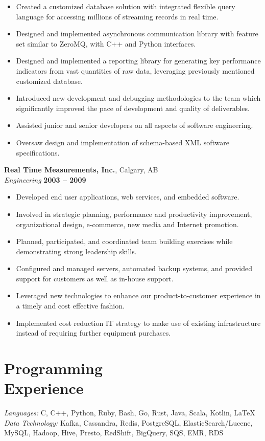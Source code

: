\documentclass[margin,line]{resume}
\begin{document}
\begin{resume}
    \begin{itemize}
    \item Created a customized database solution with integrated flexible query language for accessing millions of streaming records in real time.
    \item Designed and implemented asynchronous communication library with feature set similar to ZeroMQ, with C++ and Python interfaces.
    \item Designed and implemented a reporting library for generating key performance indicators from vast quantities of raw data, leveraging previously mentioned customized database.
    \item Introduced new development and debugging methodologies to the team which significantly improved the pace of development and quality of deliverables.
    \item Assisted junior and senior developers on all aspects of software engineering.
    \item Oversaw design and implementation of schema-based XML software specifications.
    \end{itemize}

    \textbf{Real Time Measurements, Inc.}, Calgary, AB \vspace{2mm}\\\vspace{1mm}%
    \textsl{Engineering} \hfill \textbf{2003 -- 2009}\\

    \begin{itemize}
    \item Developed end user applications, web services, and embedded software.
    \item Involved in strategic planning, performance and productivity improvement, organizational design, e-commerce, new media and Internet promotion.
    \item Planned, participated, and coordinated team building exercises while demonstrating strong leadership skills.
    \item Configured and managed servers, automated backup systems, and provided support for customers as well as in-house support.
    \item Leveraged new technologies to enhance our product-to-customer experience in a timely and cost effective fashion.
    \item Implemented cost reduction IT strategy to make use of existing infrastructure instead of requiring further equipment purchases.
    \end{itemize}

    \section{\mysidestyle Programming\\Experience}

    \emph{Languages:} C, C++, Python, Ruby, Bash, Go, Rust, Java, Scala, Kotlin, \LaTeX \\
    \emph{Data Technology:} Kafka, Cassandra, Redis, PostgreSQL, ElasticSearch/Lucene,
     MySQL, Hadoop, Hive, Presto, RedShift, BigQuery, SQS, EMR, RDS

\end{resume}
\end{document}
